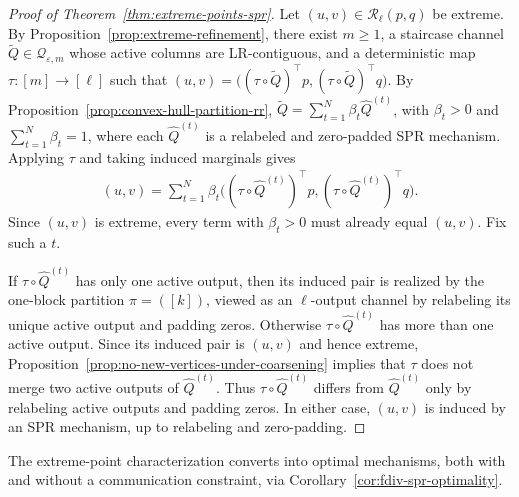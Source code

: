 \documentclass{article}
\theoremstyle{plain}
\theoremstyle{definition}
\theoremstyle{plain}
\newcommand{\eps}{\varepsilon}
\begin{document}
\begin{proof}[Proof of Theorem~\ref{thm:extreme-points-spr}]
Let $(u,v)\in\mathcal R_\ell(p,q)$ be extreme. By Proposition~\ref{prop:extreme-refinement}, there exist $m\ge 1$, a staircase channel $\widetilde Q\in\mathcal Q_{\eps,m}$ whose active columns are LR-contiguous, and a deterministic map $\tau:[m]\to[\ell]$ such that $(u,v)=\bigl((\tau\circ\widetilde Q)^\top p,(\tau\circ\widetilde Q)^\top q\bigr)$.
By Proposition~\ref{prop:convex-hull-partition-rr}, $\widetilde Q=\sum_{t=1}^N \beta_t \widehat Q^{(t)}$, with $\beta_t>0$ and $\sum_{t=1}^N \beta_t=1$, where each $\widehat Q^{(t)}$ is a relabeled and zero-padded SPR mechanism. Applying $\tau$ and taking induced marginals gives
\begin{align}
    (u,v)=\sum_{t=1}^N
    \beta_t\bigl((\tau\circ\widehat Q^{(t)})^\top p,(\tau\circ\widehat Q^{(t)})^\top q\bigr).
\end{align}
Since $(u,v)$ is extreme, every term with $\beta_t>0$ must already equal $(u,v)$. Fix such a $t$.

If $\tau\circ\widehat Q^{(t)}$ has only one active output, then its induced pair is realized by the one-block partition $\pi=([k])$, viewed as an $\ell$-output channel by relabeling its unique active output and padding zeros. Otherwise $\tau\circ\widehat Q^{(t)}$ has more than one active output. Since its induced pair is $(u,v)$ and hence extreme, Proposition~\ref{prop:no-new-vertices-under-coarsening} implies that $\tau$ does not merge two active outputs of $\widehat Q^{(t)}$. Thus $\tau\circ\widehat Q^{(t)}$ differs from $\widehat Q^{(t)}$ only by relabeling active outputs and padding zeros. In either case, $(u,v)$ is induced by an SPR mechanism, up to relabeling and zero-padding.
\end{proof}

The extreme-point characterization converts into optimal mechanisms, both with and without a communication constraint, via Corollary~\ref{cor:fdiv-spr-optimality}.
\end{document}
